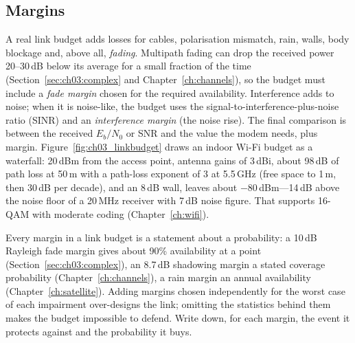 \subsection{Margins}

A real link budget adds losses for cables, polarisation mismatch, rain, walls, body blockage and, above all,
\emph{fading}. Multipath fading can drop the received power 20--30\,dB below its average for a small
fraction of the time (Section~\ref{sec:ch03:complex} and Chapter~\ref{ch:channels}), so the budget must
include a \emph{fade margin} chosen for the required availability. Interference adds to noise; when it is
noise-like, the budget uses the signal-to-interference-plus-noise ratio (SINR) and an \emph{interference
margin} (the noise rise). The final comparison is between the received $E_b/N_0$ or SNR and the value the
modem needs, plus margin. Figure~\ref{fig:ch03_linkbudget} draws an indoor Wi-Fi budget as a waterfall:
20\,dBm from the access point, antenna gains of 3\,dBi, about 98\,dB of path loss at 50\,m with a path-loss
exponent of 3 at 5.5\,GHz (free space to 1\,m, then 30\,dB per decade), and an 8\,dB wall, leaves about
$-80$\,dBm---14\,dB above the noise floor of a 20\,MHz receiver with 7\,dB noise figure. That supports 16-QAM
with moderate coding (Chapter~\ref{ch:wifi}).


\begin{pitfall}
Every margin in a link budget is a statement about a probability: a 10\,dB Rayleigh fade margin gives about
90\% availability at a point (Section~\ref{sec:ch03:complex}), an 8.7\,dB shadowing margin a stated coverage
probability (Chapter~\ref{ch:channels}), a rain margin an annual availability (Chapter~\ref{ch:satellite}).
Adding margins chosen independently for the worst case of each impairment over-designs the link; omitting the
statistics behind them makes the budget impossible to defend. Write down, for each margin, the event it
protects against and the probability it buys.
\end{pitfall}

